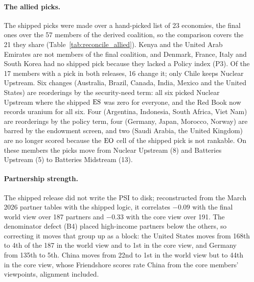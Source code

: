 \paragraph{The allied picks.} The shipped picks were made over a hand-picked list of 23 economies,
the final ones over the 57 members of the derived coalition, so the comparison covers the 21 they
share (Table~\ref{tab:reconcile_allied}). Kenya and the United Arab Emirates are not members of the
final coalition, and Denmark, France, Italy and South Korea had no shipped pick because they lacked
a Policy index (P3). Of the 17 members with a pick in both releases, 16 change it; only Chile keeps
Nuclear Upstream. Six changes (Australia, Brazil, Canada, India, Mexico and the United States) are
reorderings by the security-need term: all six picked Nuclear Upstream where the shipped $\mathrm{ES}$ was
zero for everyone, and the Red Book now records uranium for all six. Four (Argentina, Indonesia,
South Africa, Viet Nam) are reorderings by the policy term, four (Germany, Japan, Morocco, Norway)
are barred by the endowment screen, and two (Saudi Arabia, the United Kingdom) are no longer scored
because the $\mathrm{EO}$ cell of the shipped pick is not rankable. On these members the picks move from
Nuclear Upstream (8) and Batteries Upstream (5) to Batteries Midstream (13).



\paragraph{Partnership strength.} The shipped release did not write the PSI to disk; reconstructed from the March 2026
partner tables with the shipped logic, it correlates $-0.09$ with the final world view over 187
partners and $-0.33$ with the core view over 191. The denominator defect (B4) placed high-income
partners below the others, so correcting it moves that group up as a block: the United States moves
from 168th to 4th of the 187 in the world view and to 1st in the core view, and Germany from 135th to
5th. China moves from 22nd to 1st in the world view but to 44th in the core view, whose Friendshore
scores rate China from the core members' viewpoints, alignment included.


